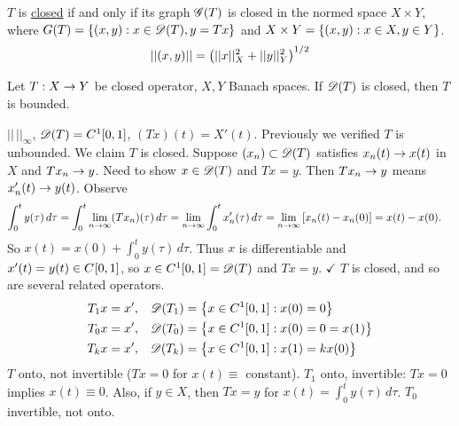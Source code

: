 \documentclass[]{article}
\begin{document}
\begin{theorem}
	$T$ is \ul{closed} if and only if its graph $\mathscr{G}(T)$ is closed in the normed space $X\times Y$, where $G(T) = \left\{ (x,y) : x\in\mathscr{D}(T),y=Tx \right\}$ and $X\times Y = \left\{ (x,y) : x\in X,y\in Y \right\}$.
	$$ ||(x,y)|| = \left(||x||_X^2+||y||_Y^2\right)^{1/2} $$
\end{theorem}
\newpage
\begin{theorem}
	Let $T:X\rightarrow Y$ be closed operator, $X,Y$ Banach spaces.
	If $\mathscr{D}(T)$ is closed, then $T$ is bounded.
\end{theorem}
\begin{example}
	[$X=\Cb{}01$]
	$||\,||_\infty$, $\mathscr{D}(T)=C^{1}{[}0,1{]}$, $(Tx)(t)=X'(t)$.
	Previously we verified $T$ is unbounded. We claim $T$ is closed.
	Suppose $(x_n)\subset\mathscr{D}(T)$ satisfies $x_n(t)\rightarrow x(t)$ in $X$ and $Tx_n\rightarrow y$.
	Need to show $x\in\mathscr{D}(T)$ and $Tx=y$.
	Then $Tx_n\rightarrow y$ means $x_n'(t)\rightarrow y(t)$. Observe
	\begin{align*}
		\int_0^t y(\tau)\,d\tau 
		&= \int_0^t \lim_{n\rightarrow\infty}(Tx_n)(\tau)\,d\tau
		= \lim_{n\rightarrow\infty} \int_0^t x_n'(\tau)\,d\tau
		= \lim_{n\rightarrow\infty}\left[x_n(t)-x_n(0)\right] = x(t)-x(0).
	\end{align*}
	So $x(t)=x(0)+\int_0^t y(\tau)\,d\tau$.
	Thus $x$ is differentiable and $x'(t)=y(t)\in C^{}{[}0,1{]}$, so $x\in C^{1}{[}0,1{]}=\mathscr{D}(T)$ and $Tx=y$. $\checkmark$
	$T$ is closed, and so are several related operators.
	\begin{align*}
		T_1x &= x', & \mathscr{D}(T_1) &= \left\{ x\in C^{1}{[}0,1{]} : x(0)=0 \right\} \\
		T_0x &= x', & \mathscr{D}(T_0) &= \left\{ x\in C^{1}{[}0,1{]} : x(0)=0=x(1) \right\} \\
		T_kx &= x', & \mathscr{D}(T_k) &= \left\{ x\in C^{1}{[}0,1{]} : x(1)=k x(0) \right\}
	\end{align*}
	$T$ onto, not invertible ($Tx=0$ for $x(t)\equiv$ constant).
	$T_1$ onto, invertible: $Tx=0$ implies $x(t)\equiv0$.
	Also, if $y\in X$, then $Tx=y$ for $x(t)=\int_0^ty(\tau)\,d\tau$.
	$T_0$ invertible, not onto.
\end{example}
\end{document}
